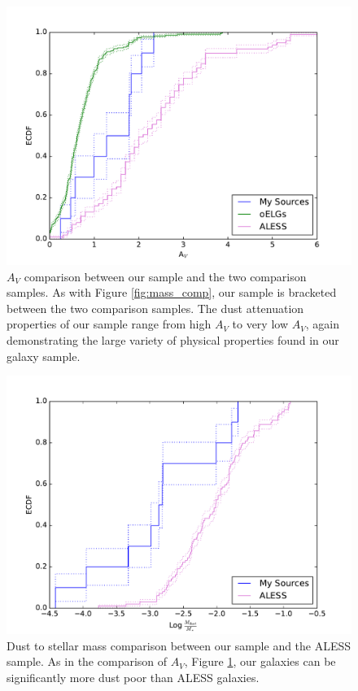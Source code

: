 \documentclass[preprint,natbib209]{aastex}
\begin{document}
\begin{figure}[t]
\centering
\includegraphics[scale=0.8]{ecdf_av.pdf}
\caption{$A_V$ comparison between our sample and the two comparison samples. As with Figure \ref{fig:mass_comp}, our sample is bracketed between the two comparison samples. The dust attenuation properties of our sample range from high $A_V$ to very low $A_V$, again demonstrating the large variety of physical properties found in our galaxy sample.}
\label{fig:av_comp}
\end{figure}

\begin{figure}[t]
\centering
\includegraphics[scale=0.8]{ecdf_mdust_mstar.pdf}
\caption{Dust to stellar mass comparison between our sample and the ALESS sample. As in the comparison of $A_V$, Figure \ref{fig:av_comp}, our galaxies can be significantly more dust poor than ALESS galaxies.}
\label{fig:mstar_mdust}
\end{figure}
\end{document}
